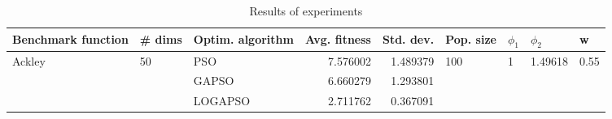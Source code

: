 \begin{table}
\centering
\caption{Results of experiments}
\begin{tabular}{lllrrllll}
\toprule
     Benchmark function &             \# dims & Optim. algorithm &  Avg. fitness &  Std. dev. &            Pop. size &         $\phi_{1}$ &               $\phi_{2}$ &                     w \\
\midrule
\multirow{3}{*}{Ackley} & \multirow{3}{*}{50} &              PSO &      7.576002 &   1.489379 & \multirow{3}{*}{100} & \multirow{3}{*}{1} & \multirow{3}{*}{1.49618} & \multirow{3}{*}{0.55} \\
                        &                     &            GAPSO &      6.660279 &   1.293801 &                      &                    &                          &                       \\
                        &                     &          LOGAPSO &      2.711762 &   0.367091 &                      &                    &                          &                       \\
\bottomrule
\end{tabular}
\end{table}
